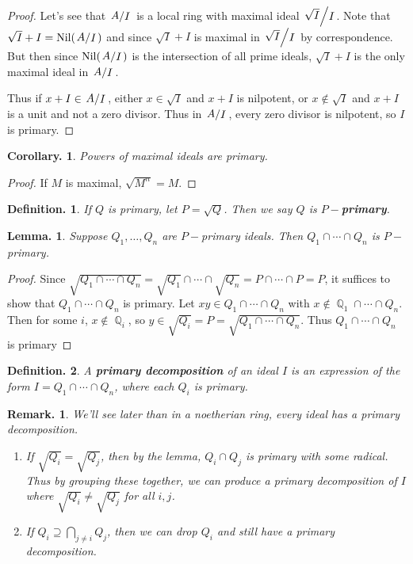 \documentclass[11pt, a4paper]{memoir}
\DeclareMathOperator{\Q}{{\mathbb{Q}}}
\newcommand{\mbf}[1]{{\boldmath\bfseries #1}}
\theoremstyle{change}
\newtheorem{lemma}[theorem]{Lemma.}
\newtheorem{corollary}[theorem]{Corollary.}
\theoremstyle{plain}
\theoremstyle{nonumberplain}
\newtheorem{definition}{Definition.}
\newtheorem{remark}{Remark.}
\newtheorem{proof}{Proof}
\DeclareMathOperator{\Nil}{Nil}
\newcommand{\quot}[2]{\mathchoice{\left.\raisebox{0.10em}{$#1$}\middle/\raisebox{-0.10em}{$#2$}\right.}
                                 {\left.\raisebox{0.04em}{$#1$}\middle/\raisebox{-0.04em}{$#2$}\right.}
                                 {\left.\raisebox{0.01em}{$#1$}\middle/\raisebox{-0.01em}{$#2$}\right.}
                                 {\left.\raisebox{0em}{$#1$}\middle/\raisebox{0em}{$#2$}\right.}}
\numberwithin{equation}{section}
\begin{document}
\begin{proof}
    Let's see that $\quot{A}{I}$ is a local ring with maximal ideal $\quot{\sqrt{I}}{I}$.
    Note that $\sqrt{I}+I=\Nil(\quot{A}{I})$ and since $\sqrt{I}+I$ is maximal in $\quot{\sqrt{I}}{I}$ by correspondence.
    But then since $\Nil(\quot{A}{I})$ is the intersection of all prime ideals, $\sqrt{I}+I$ is the only maximal ideal in $\quot{A}{I}$.

    Thus if $x+I\in\quot{A}{I}$, either $x\in\sqrt{I}$ and $x+I$ is nilpotent, or $x\notin\sqrt{I}$ and $x+I$ is a unit and not a zero divisor.
    Thus in $\quot{A}{I}$, every zero divisor is nilpotent, so $I$ is primary.
\end{proof}
\begin{corollary}
    Powers of maximal ideals are primary.
\end{corollary}
\begin{proof}
    If $M$ is maximal, $\sqrt{M^n}=M$.
\end{proof}
\begin{definition}
    If $Q$ is primary, let $P=\sqrt{Q}$.
    Then we say $Q$ is \mbf{$P-$primary}.
\end{definition}
\begin{lemma}
    Suppose $Q_1,\ldots,Q_n$ are $P-$primary ideals.
    Then $Q_1\cap\cdots\cap Q_n$ is $P-$primary.
\end{lemma}
\begin{proof}
    Since $\sqrt{Q_1\cap\cdots\cap Q_n}=\sqrt{Q_1}\cap\cdots\cap\sqrt{Q_n}=P\cap\cdots \cap P=P$, it suffices to show that $Q_1\cap\cdots\cap Q_n$ is primary.
    Let $xy\in Q_1\cap\cdots\cap Q_n$ with $x\notin\Q_1\cap\cdots\cap Q_n$.
    Then for some $i$, $x\notin\Q_i$, so $y\in\sqrt{Q_i}=P=\sqrt{Q_1\cap\cdots\cap Q_n}$.
    Thus $Q_1\cap\cdots\cap Q_n$ is primary
\end{proof}
\begin{definition}
    A \textbf{primary decomposition} of an ideal $I$ is an expression of the form $I=Q_1\cap\cdots\cap Q_n$, where each $Q_i$ is primary.
\end{definition}
\begin{remark}
    We'll see later than in a noetherian ring, every ideal has a primary decomposition.
    \begin{enumerate}
        \item If $\sqrt{Q_i}=\sqrt{Q_j}$, then by the lemma, $Q_i\cap Q_j$ is primary with some radical.
            Thus by grouping these together, we can produce a primary decomposition of $I$ where $\sqrt{Q_i}\neq\sqrt{Q_j}$ for all $i,j$.
        \item If $Q_i\supseteq\bigcap_{j\neq i}Q_j$, then we can drop $Q_i$ and still have a primary decomposition.
    \end{enumerate}
\end{remark}
\end{document}
